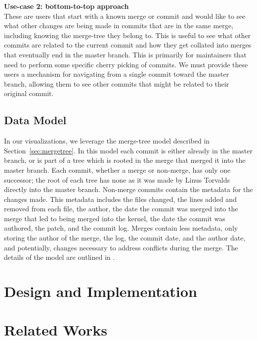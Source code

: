 \documentclass[draft]{IEEEtran}
\begin{document}
\noindent \textbf{Use-case 2: bottom-to-top
  approach}\label{sec:usecase2}\\ These are users that start with a
known merge or commit and would like to see what other changes are being
made in commits that are in the same merge, including knowing the
merge-tree they belong to. This is useful to see what other commits are
related to the current commit and how they get collated into merges that
eventually end in the master branch. This is primarily for maintainers
that need to perform some specific cherry picking of commits. We must
provide these users a mechanism for navigating from a single commit
toward the master branch, allowing them to see other commits that might
be related to their original commit.

\subsection{Data Model}

In our visualizations, we leverage the merge-tree model described in
Section~\ref{sec:mergetree}. In this model each commit is either already
in the master branch, or is part of a tree which is rooted in the merge
that merged it into the master branch.  Each commit, whether a merge or
non-merge, has only one successor; the root of each tree has none as it
was made by Linus Torvalds directly into the master branch. Non-merge
commits contain the metadata for the changes made.  This metadata
includes the files changed, the lines added and removed from each file,
the author, the date the commit was merged into the merge that led to
being merged into the kernel, the date the commit was authored, the
patch, and the commit log. Merges contain less metadata, only storing
the author of the merge, the log, the commit date, and the author date,
and potentially, changes necessary to address conflicts during the
merge. The details of the model are outlined in \cite{German2015}.


\section{Design and Implementation}



\section{Related Works}
\label{sec:related_works}


\end{document}
